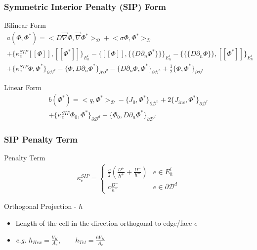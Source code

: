 \documentclass[]{beamer}
\begin{document}
\begin{frame}[t]\frametitle{Symmetric Interior Penalty (SIP) Form}
	\begin{block}{Bilinear Form}
		\begin{gather*}
			 a( \Phi, \Phi^*)  = \Big<  D \vec{\nabla}  \Phi , \vec{\nabla} \Phi^*  \Big>_{\mathcal{D}} + \Big<  \sigma   \Phi ,  \Phi^*  \Big>_{\mathcal{D}}    \\
			+  \Big\{ \kappa_e^{SIP} [\![   \Phi ]\!] , [\![  \Phi^* ]\!]\Big\}_{E_h^i} - \Big\{  [\![   \Phi ]\!] , \{\!\{  D \partial_n \Phi^* \}\!\}\Big\}_{E_h^i} -\Big\{ \{\!\{  D \partial_n  \Phi \}\!\} , [\![  \Phi^* ]\!]\Big\}_{E_h^i} \\
			+ \Big\{ \kappa_e^{SIP}   \Phi ,   \Phi^* \Big\}_{\partial \mathcal{D}^d} - \Big\{   \Phi  ,  D \partial_n \Phi^* \Big\}_{\partial \mathcal{D}^d} - \Big\{   D 				\partial_n  \Phi ,   \Phi^*\Big\}_{\partial \mathcal{D}^d}  +  \frac{1}{2} \Big\{    \Phi ,   \Phi^*\Big\}_{\partial \mathcal{D}^r}
        	\end{gather*} 
\end{block}
\begin{block}{Linear Form}
		\begin{align*}
			b(\Phi^*) = \Big<  q, \Phi^*  \Big>_{\mathcal{D}}  - \Big\{   J_{0}, \Phi^*  \Big\}_{\partial \mathcal{D}^n} +  2 \Big\{   J_{inc}, \Phi^*  \Big\}_{\partial 				\mathcal{D}^r} \\ + \Big\{ \kappa_e^{SIP}   \Phi_0 ,   \Phi^* \Big\}_{\partial \mathcal{D}^d} - \Big\{   \Phi_0  ,  D \partial_n \Phi^* \Big\}_{\partial 					\mathcal{D}^d} 
        	\end{align*} 
    \end{block}
\end{frame}
\begin{frame}[t]\frametitle{SIP Penalty Term}
	\begin{block}{Penalty Term}
		\begin{align*}
			 \kappa_e^{SIP} = 
			\begin{cases}
				\frac{c}{2} \left(  \frac{D^+}{h^+} + \frac{D^-}{h^-} \right) & e \in E_h^i\\ 
				c \frac{D^-}{h^-}& e \in \partial \mathcal{D}^d
			\end{cases}
			\label{eq::SIP_penalty_term}
        	\end{align*}
    \end{block}
	\begin{block}{Orthogonal Projection - $h$}
		\begin{itemize}
			\item Length of the cell in the direction orthogonal to edge/face $e$
			\item {\em e.g.} $ h_{Hex} = \frac{V_K}{A_e}, \qquad h_{Tet} =  \frac{6 V_K}{A_e}$
		\end{itemize}
	\end{block}
\end{frame}
\end{document}
